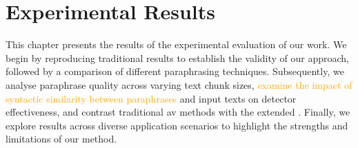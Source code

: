 \chapter{Experimental Results}
\label{chap:experimental_results}

This chapter presents the results of the experimental evaluation of our work. 
We begin by reproducing traditional results to establish the validity of our approach, followed by a comparison of different paraphrasing techniques. 
Subsequently, we analyse paraphrase quality across varying text chunk sizes, \textcolor{orange}{examine the impact of syntactic similarity between paraphrases} and input texts on detector effectiveness, and contrast traditional \ac{av} methods with the extended \impAppr{}. 
Finally, we explore results across diverse application scenarios to highlight the strengths and limitations of our method. 










% 

% 

% 
